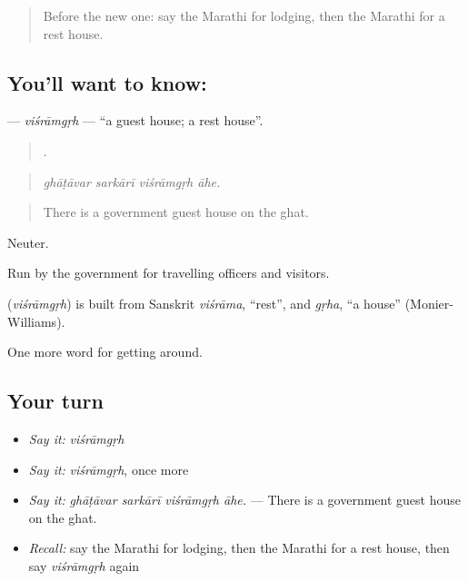 \label{lesson:MR-C413-visramgrh}



\begin{quote}
Before the new one: say the Marathi for lodging, then the Marathi for a rest house.
\end{quote}

\subsection*{You'll want to know: }
\textbf{} — \emph{viśrāmgṛh} — \textquotedblleft{}a guest house; a rest house\textquotedblright{}.

\begin{quote}
   .
\end{quote}

\begin{quote}
\emph{ghāṭāvar sarkārī viśrāmgṛh āhe.}
\end{quote}

\begin{quote}
There is a government guest house on the ghat.
\end{quote}

Neuter.

Run by the government for travelling officers and visitors.

\begin{cousinweb}
\textbf{} (\emph{viśrāmgṛh}) is built from Sanskrit \emph{viśrāma}, \textquotedblleft{}rest\textquotedblright{}, and \emph{gṛha}, \textquotedblleft{}a house\textquotedblright{} (Monier-Williams).
\end{cousinweb}

\begin{grammarlens}[title={What you've built}]
One more word for getting around.
\end{grammarlens}

\subsection*{Your turn}
\begin{itemize}
\raggedright
  \item \emph{Say it:} \emph{viśrāmgṛh}
  \item \emph{Say it:} \emph{viśrāmgṛh}, once more
  \item \emph{Say it:} \emph{ghāṭāvar sarkārī viśrāmgṛh āhe.} — There is a government guest house on the ghat.
  \item \emph{Recall:} say the Marathi for lodging, then the Marathi for a rest house, then say \emph{viśrāmgṛh} again
\end{itemize}

